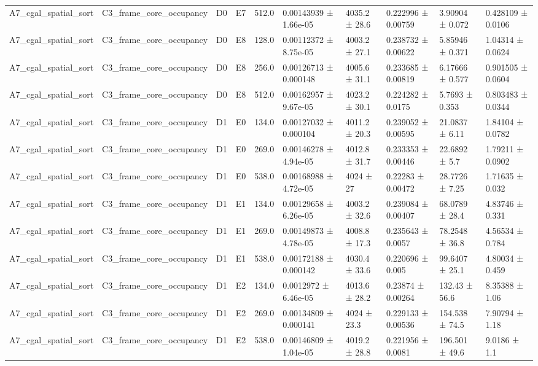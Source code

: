 \begin{table}
\begin{tabular}{llllllllll}
A7\_cgal\_spatial\_sort & C3\_frame\_core\_occupancy & D0 & E7 & 512.0 & 0.00143939 ± 1.66e-05 & 4035.2 ± 28.6 & 0.222996 ± 0.00759 & 3.90904 ± 0.072 & 0.428109 ± 0.0106 \\
A7\_cgal\_spatial\_sort & C3\_frame\_core\_occupancy & D0 & E8 & 128.0 & 0.00112372 ± 8.75e-05 & 4003.2 ± 27.1 & 0.238732 ± 0.00622 & 5.85946 ± 0.371 & 1.04314 ± 0.0624 \\
A7\_cgal\_spatial\_sort & C3\_frame\_core\_occupancy & D0 & E8 & 256.0 & 0.00126713 ± 0.000148 & 4005.6 ± 31.1 & 0.233685 ± 0.00819 & 6.17666 ± 0.577 & 0.901505 ± 0.0604 \\
A7\_cgal\_spatial\_sort & C3\_frame\_core\_occupancy & D0 & E8 & 512.0 & 0.00162957 ± 9.67e-05 & 4023.2 ± 30.1 & 0.224282 ± 0.0175 & 5.7693 ± 0.353 & 0.803483 ± 0.0344 \\
A7\_cgal\_spatial\_sort & C3\_frame\_core\_occupancy & D1 & E0 & 134.0 & 0.00127032 ± 0.000104 & 4011.2 ± 20.3 & 0.239052 ± 0.00595 & 21.0837 ± 6.11 & 1.84104 ± 0.0782 \\
A7\_cgal\_spatial\_sort & C3\_frame\_core\_occupancy & D1 & E0 & 269.0 & 0.00146278 ± 4.94e-05 & 4012.8 ± 31.7 & 0.233353 ± 0.00446 & 22.6892 ± 5.7 & 1.79211 ± 0.0902 \\
A7\_cgal\_spatial\_sort & C3\_frame\_core\_occupancy & D1 & E0 & 538.0 & 0.00168988 ± 4.72e-05 & 4024 ± 27 & 0.22283 ± 0.00472 & 28.7726 ± 7.25 & 1.71635 ± 0.032 \\
A7\_cgal\_spatial\_sort & C3\_frame\_core\_occupancy & D1 & E1 & 134.0 & 0.00129658 ± 6.26e-05 & 4003.2 ± 32.6 & 0.239084 ± 0.00407 & 68.0789 ± 28.4 & 4.83746 ± 0.331 \\
A7\_cgal\_spatial\_sort & C3\_frame\_core\_occupancy & D1 & E1 & 269.0 & 0.00149873 ± 4.78e-05 & 4008.8 ± 17.3 & 0.235643 ± 0.0057 & 78.2548 ± 36.8 & 4.56534 ± 0.784 \\
A7\_cgal\_spatial\_sort & C3\_frame\_core\_occupancy & D1 & E1 & 538.0 & 0.00172188 ± 0.000142 & 4030.4 ± 33.6 & 0.220696 ± 0.005 & 99.6407 ± 25.1 & 4.80034 ± 0.459 \\
A7\_cgal\_spatial\_sort & C3\_frame\_core\_occupancy & D1 & E2 & 134.0 & 0.0012972 ± 6.46e-05 & 4013.6 ± 28.2 & 0.23874 ± 0.00264 & 132.43 ± 56.6 & 8.35388 ± 1.06 \\
A7\_cgal\_spatial\_sort & C3\_frame\_core\_occupancy & D1 & E2 & 269.0 & 0.00134809 ± 0.000141 & 4024 ± 23.3 & 0.229133 ± 0.00536 & 154.538 ± 74.5 & 7.90794 ± 1.18 \\
A7\_cgal\_spatial\_sort & C3\_frame\_core\_occupancy & D1 & E2 & 538.0 & 0.00146809 ± 1.04e-05 & 4019.2 ± 28.8 & 0.221956 ± 0.0081 & 196.501 ± 49.6 & 9.0186 ± 1.1 \\

\end{tabular}
\end{table}
